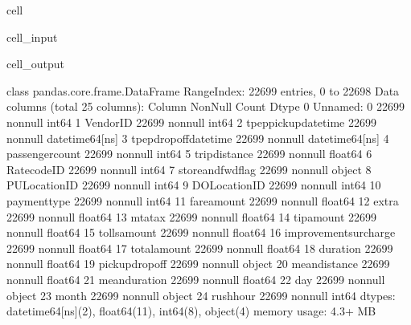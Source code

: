 \documentclass[letterpaper,10pt,english]{sphinxmanual}
\begin{document}
\begin{sphinxuseclass}{cell}
\begin{sphinxuseclass}{cell_input}
\begin{sphinxVerbatim}[commandchars=\\\{\}]
\end{sphinxVerbatim}

\end{sphinxuseclass}
\begin{sphinxuseclass}{cell_output}
\begin{sphinxVerbatim}[commandchars=\\\{\}]
\PYGZlt{}class \PYGZsq{}pandas.core.frame.DataFrame\PYGZsq{}\PYGZgt{}
RangeIndex: 22699 entries, 0 to 22698
Data columns (total 25 columns):
 \PYGZsh{}   Column                 Non\PYGZhy{}Null Count  Dtype         
\PYGZhy{}\PYGZhy{}\PYGZhy{}  \PYGZhy{}\PYGZhy{}\PYGZhy{}\PYGZhy{}\PYGZhy{}\PYGZhy{}                 \PYGZhy{}\PYGZhy{}\PYGZhy{}\PYGZhy{}\PYGZhy{}\PYGZhy{}\PYGZhy{}\PYGZhy{}\PYGZhy{}\PYGZhy{}\PYGZhy{}\PYGZhy{}\PYGZhy{}\PYGZhy{}  \PYGZhy{}\PYGZhy{}\PYGZhy{}\PYGZhy{}\PYGZhy{}         
 0   Unnamed: 0             22699 non\PYGZhy{}null  int64         
 1   VendorID               22699 non\PYGZhy{}null  int64         
 2   tpep\PYGZus{}pickup\PYGZus{}datetime   22699 non\PYGZhy{}null  datetime64[ns]
 3   tpep\PYGZus{}dropoff\PYGZus{}datetime  22699 non\PYGZhy{}null  datetime64[ns]
 4   passenger\PYGZus{}count        22699 non\PYGZhy{}null  int64         
 5   trip\PYGZus{}distance          22699 non\PYGZhy{}null  float64       
 6   RatecodeID             22699 non\PYGZhy{}null  int64         
 7   store\PYGZus{}and\PYGZus{}fwd\PYGZus{}flag     22699 non\PYGZhy{}null  object        
 8   PULocationID           22699 non\PYGZhy{}null  int64         
 9   DOLocationID           22699 non\PYGZhy{}null  int64         
 10  payment\PYGZus{}type           22699 non\PYGZhy{}null  int64         
 11  fare\PYGZus{}amount            22699 non\PYGZhy{}null  float64       
 12  extra                  22699 non\PYGZhy{}null  float64       
 13  mta\PYGZus{}tax                22699 non\PYGZhy{}null  float64       
 14  tip\PYGZus{}amount             22699 non\PYGZhy{}null  float64       
 15  tolls\PYGZus{}amount           22699 non\PYGZhy{}null  float64       
 16  improvement\PYGZus{}surcharge  22699 non\PYGZhy{}null  float64       
 17  total\PYGZus{}amount           22699 non\PYGZhy{}null  float64       
 18  duration               22699 non\PYGZhy{}null  float64       
 19  pickup\PYGZus{}dropoff         22699 non\PYGZhy{}null  object        
 20  mean\PYGZus{}distance          22699 non\PYGZhy{}null  float64       
 21  mean\PYGZus{}duration          22699 non\PYGZhy{}null  float64       
 22  day                    22699 non\PYGZhy{}null  object        
 23  month                  22699 non\PYGZhy{}null  object        
 24  rush\PYGZus{}hour              22699 non\PYGZhy{}null  int64         
dtypes: datetime64[ns](2), float64(11), int64(8), object(4)
memory usage: 4.3+ MB
\end{sphinxVerbatim}

\end{sphinxuseclass}
\end{sphinxuseclass}
\end{document}
